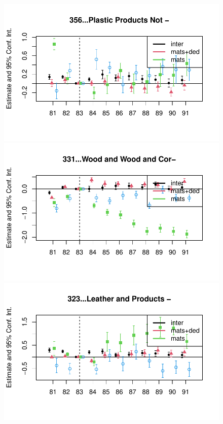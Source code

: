 \documentclass[
  12pt]{article}
\theoremstyle{definition}
\theoremstyle{remark}
\begin{document}
\begin{figure}
\begin{minipage}{\linewidth}
\includegraphics{Tax-Prod_files/figure-pdf/unnamed-chunk-12-16.pdf}

\includegraphics{Tax-Prod_files/figure-pdf/unnamed-chunk-12-17.pdf}

\includegraphics{Tax-Prod_files/figure-pdf/unnamed-chunk-12-18.pdf}

\end{minipage}%

\end{figure}%
\end{document}
